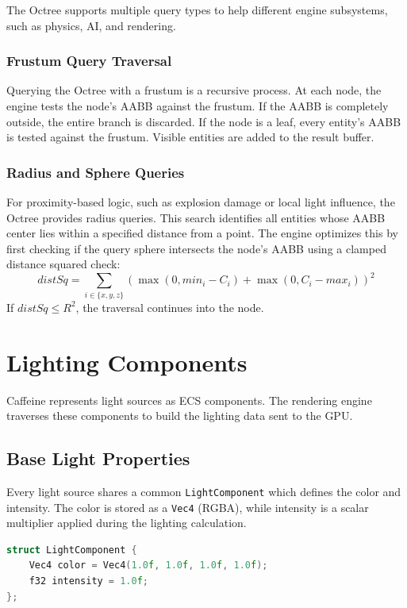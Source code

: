 The Octree supports multiple query types to help different engine subsystems, such as physics, AI, and rendering.

\subsubsection{Frustum Query Traversal}
Querying the Octree with a frustum is a recursive process. At each node, the engine tests the node's AABB against the frustum. If the AABB is completely outside, the entire branch is discarded. If the node is a leaf, every entity's AABB is tested against the frustum. Visible entities are added to the result buffer.

\subsubsection{Radius and Sphere Queries}
For proximity-based logic, such as explosion damage or local light influence, the Octree provides radius queries. This search identifies all entities whose AABB center lies within a specified distance from a point. The engine optimizes this by first checking if the query sphere intersects the node's AABB using a clamped distance squared check:
\begin{equation}
    distSq = \sum_{i \in \{x,y,z\}} (\max(0, min_i - C_i) + \max(0, C_i - max_i))^2
\end{equation}
If $distSq \leq R^2$, the traversal continues into the node.

\section{Lighting Components}

Caffeine represents light sources as ECS components. The rendering engine traverses these components to build the lighting data sent to the GPU.

\subsection{Base Light Properties}

Every light source shares a common \texttt{LightComponent} which defines the color and intensity. The color is stored as a \texttt{Vec4} (RGBA), while intensity is a scalar multiplier applied during the lighting calculation.

\begin{lstlisting}[language=C++]
struct LightComponent {
    Vec4 color = Vec4(1.0f, 1.0f, 1.0f, 1.0f);
    f32 intensity = 1.0f;
};
\end{lstlisting}

